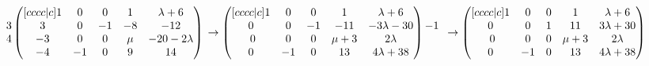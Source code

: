 \documentclass{article}
\begin{document}
\begin{math}
\begin{matrix}
          3\\
          4
        \end{matrix}
        \begin{pmatrix}[cccc|c]
            1 & 0 & 0 & 1 & \lambda + 6\\
            3 & 0 & -1 & -8 & -12\\
            -3 & 0 & 0 & \mu & -20 - 2\lambda\\
            -4 & -1 & 0 & 9 & 14
        \end{pmatrix}\\
        \\
        \\
        \to
        \begin{pmatrix}[cccc|c]
            1 & 0 & 0 & 1 & \lambda + 6\\
            0 & 0 & -1 & -11 & -3\lambda - 30\\\
            0 & 0 & 0 & \mu + 3 & 2\lambda\\
            0 & -1 & 0 & 13 & 4\lambda + 38
        \end{pmatrix}
        \begin{matrix}
          ~\\
          -1\\
          ~\\
          ~
        \end{matrix}\\
        \\
        \\
        \to
        \begin{pmatrix}[cccc|c]
            1 & 0 & 0 & 1 & \lambda + 6\\
            0 & 0 & 1 & 11 & 3\lambda + 30\\\
            0 & 0 & 0 & \mu + 3 & 2\lambda\\
            0 & -1 & 0 & 13 & 4\lambda + 38
        \end{pmatrix}
    \end{math}
\end{document}
